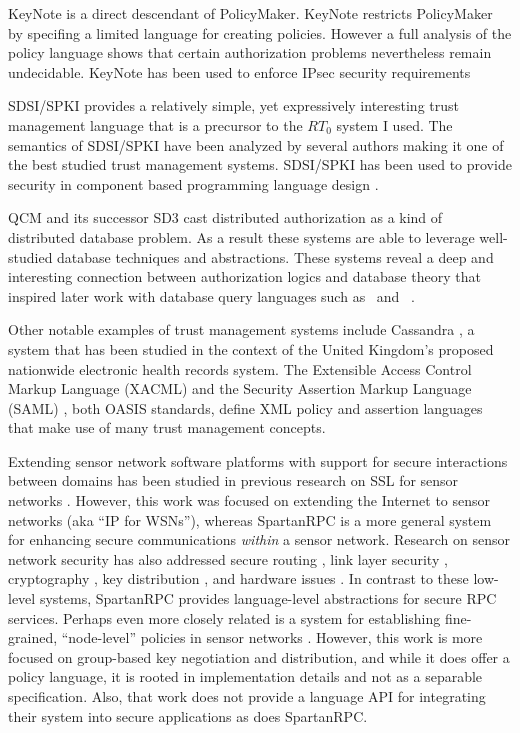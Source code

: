 KeyNote \cite{RFC-2704} is a direct descendant of PolicyMaker. KeyNote restricts PolicyMaker by
specifing a limited language for creating policies. However a full analysis of the policy
language \cite{Li:DCFTML} shows that certain authorization problems nevertheless remain
undecidable. KeyNote has been used to enforce IPsec security requirements
\cite{Blaze:TMIPS,Blaze:EKTMS}

SDSI/SPKI \cite{Rivest:SDSI-11,RFC-2693} provides a relatively simple, yet expressively
interesting trust management language that is a precursor to the $RT_0$ system I used. The
semantics of SDSI/SPKI have been analyzed by several authors
\cite{Abadi:OSLLNS,Halpern:LSSLLNS,Howell:FSS,Li:LNSS,Clarke:CCDSS} making it one of the best
studied trust management systems. SDSI/SPKI has been used to provide security in component based
programming language design \cite{Liu:CSI}.

QCM \cite{Gunter:DALSI,Gunter:GCR} and its successor SD3 \cite{Jim:STMSCE,Jim:DDQE} cast
distributed authorization as a kind of distributed database problem. As a result these systems
are able to leverage well-studied database techniques and abstractions. These systems reveal a
deep and interesting connection between authorization logics and database theory that inspired
later work with database query languages such as \datalog\ and \datalogc\ \cite{Li:DCFTML}.

Other notable examples of trust management systems include Cassandra \cite{Becker:CFTMAEHR}, a
system that has been studied in the context of the United Kingdom's proposed nationwide
electronic health records system. The Extensible Access Control Markup Language (XACML)
\cite{OASIS:XACMLTC} and the Security Assertion Markup Language (SAML) \cite{OASIS:SSTC}, both
OASIS standards, define XML policy and assertion languages that make use of many trust
management concepts.


Extending sensor network software platforms with support for secure interactions between domains
has been studied in previous research on SSL for sensor networks \cite{10.1109/WAINA.2009.47}.
However, this work was focused on extending the Internet to sensor networks (aka ``IP for
WSNs''), whereas SpartanRPC is a more general system for enhancing secure communications
\emph{within} a sensor network. Research on sensor network security has also addressed secure
routing \cite{senroute-ahnj03}, link layer security \cite{karlog-tinysec-2004}, cryptography
\cite{bertoni-2006}, key distribution \cite{camtepe-bulent-05}, and hardware issues
\cite{perrig-2004}. In contrast to these low-level systems, SpartanRPC provides language-level
abstractions for secure RPC services. Perhaps even more closely related is a system for
establishing fine-grained, ``node-level'' policies in sensor networks
\cite{Claycomb:2011:NNL:1889383.1889450}. However, this work is more focused on group-based key
negotiation and distribution, and while it does offer a policy language, it is rooted in
implementation details and not as a separable specification. Also, that work does not provide a
language API for integrating their system into secure applications as does SpartanRPC.


